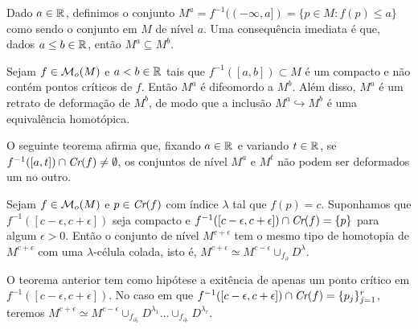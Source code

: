 \documentclass{beamer}
\begin{document}
\begin{frame}
	Dado $a \in \mathbb{R}^{}$, definimos o conjunto $M^{a}= f^{-1}((-\infty, a]) = \{p \in M: f(p)\leq a\}$ como sendo o conjunto em $M$ de nível $a$. Uma consequência imediata é que, dados $a\leq b \in \mathbb{R}^{}$, então $M^{a} \subseteq M^{b}$.
	
	\begin{teorema}
		Sejam $f \in \mathcal{M}_{o}(M)$ e $a<b \in \mathbb{R}^{}$ tais que $f^{-1}([a,b])\subset M$ é um compacto e não contém pontos críticos de $f$. Então $M^{a}$ é difeomordo a $M^{b}$. Além disso, $M^{a}$ é um retrato de deformação de $M^{b}$, de modo que a inclusão  $M^{a} \hookrightarrow M^{b}$ é uma equivalência homotópica.
	\end{teorema}
	
\end{frame}

\begin{frame}
	O seguinte teorema afirma que, fixando $a \in \mathbb{R}^{}$ e variando $t \in \mathbb{R}^{}$, se $f^{-1}([a,t]) \cap \textit{Cr}(f) \neq \emptyset$, os conjuntos de nível $M^{a}$ e $M^{t}$ não podem ser deformados um no outro.
	
	\begin{teorema}
		Sejam $f\in \mathcal{M}_{o}(M)$ e $p\in \textit{Cr}(f)$ com índice $\lambda$ tal que $f(p) = c$. Suponhamos que $f^{-1}([c-\epsilon,c+\epsilon])$ seja compacto e $f^{-1}([c-\epsilon,c+\epsilon])\cap \textit{Cr}(f) = \{p\}$ para algum $\epsilon>0$. Então o conjunto de nível $M^{c+\epsilon}$ tem o mesmo tipo de homotopia de $M^{c+\epsilon}$ com uma $\lambda$-célula colada, isto é, $M^{c+\epsilon} \simeq M^{c-\epsilon}\cup_{f_{\partial}} D^{\lambda}$.
	\end{teorema}
	\begin{observacao}
		O teorema anterior tem como hipótese a exitência de apenas um ponto crítico em $f^{-1}([c-\epsilon,c+\epsilon])$. No caso em que $f^{-1}([c-\epsilon,c+\epsilon]) \cap \textit{Cr}(f) = \{p_{j}\}_{j=1}^{r}$, teremos $M^{c+\epsilon} \simeq M^{c-\epsilon}\cup_{f_{\partial_{1}}} D^{\lambda_{1}}\dots  \cup_{f_{\partial_{r}}} D^{\lambda_{r}}$.
	\end{observacao}
\end{frame}
\end{document}
